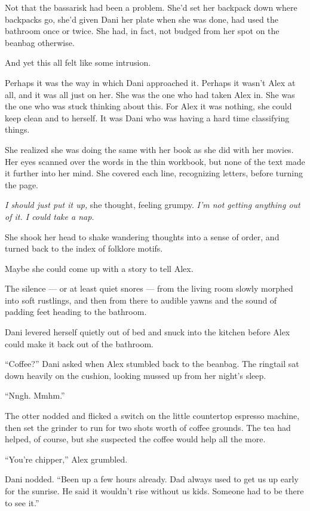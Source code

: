 Not that the bassarisk had been a problem. She'd set her backpack down where backpacks go, she'd given Dani her plate when she was done, had used the bathroom once or twice. She had, in fact, not budged from her spot on the beanbag otherwise.

And yet this all felt like some intrusion.

Perhaps it was the way in which Dani approached it. Perhaps it wasn't Alex at all, and it was all just on her. She was the one who had taken Alex in. She was the one who was stuck thinking about this. For Alex it was nothing, she could keep clean and to herself. It was Dani who was having a hard time classifying things.

She realized she was doing the same with her book as she did with her movies. Her eyes scanned over the words in the thin workbook, but none of the text made it further into her mind. She covered each line, recognizing letters, before turning the page.

\emph{I should just put it up,} she thought, feeling grumpy. \emph{I'm not getting anything out of it. I could take a nap.}

She shook her head to shake wandering thoughts into a sense of order, and turned back to the index of folklore motifs.

Maybe she could come up with a story to tell Alex.

\secdiv

The silence --- or at least quiet snores --- from the living room slowly morphed into soft rustlings, and then from there to audible yawns and the sound of padding feet heading to the bathroom.

Dani levered herself quietly out of bed and snuck into the kitchen before Alex could make it back out of the bathroom.

``Coffee?'' Dani asked when Alex stumbled back to the beanbag. The ringtail sat down heavily on the cushion, looking mussed up from her night's sleep.

``Nngh. Mmhm.''

The otter nodded and flicked a switch on the little countertop espresso machine, then set the grinder to run for two shots worth of coffee grounds. The tea had helped, of course, but she suspected the coffee would help all the more.

``You're chipper,'' Alex grumbled.

Dani nodded. ``Been up a few hours already. Dad always used to get us up early for the sunrise. He said it wouldn't rise without us kids. Someone had to be there to see it.''


